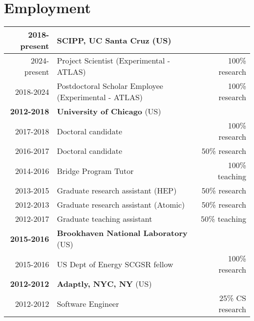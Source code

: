 \vspace{-2.0em}\section{Employment}\vspace{-1em}
\begin{table*}[h!]
	\footnotesize
	\begin{tabular}{r|lr}
		\centering
		\normalsize\textbf{2018-present} & \textbf{SCIPP, UC Santa Cruz} (US)                   &                  \\
		\hline
		2024-present                     & Project Scientist (Experimental - ATLAS)             & 100\% research   \\
		2018-2024                        & Postdoctoral Scholar Employee (Experimental - ATLAS) & 100\% research   \\
		\hline\hline
		\normalsize\textbf{2012-2018}    & \textbf{University of Chicago} (US)                  &                  \\
		\hline
		2017-2018                        & Doctoral candidate                                   & 100\% research   \\
		2016-2017                        & Doctoral candidate                                   & 50\% research    \\
		2014-2016                        & Bridge Program Tutor                                 & 100\% teaching   \\
		2013-2015                        & Graduate research assistant (HEP)                    & 50\% research    \\
		2012-2013                        & Graduate research assistant (Atomic)                 & 50\% research    \\
		2012-2017                        & Graduate teaching assistant                          & 50\% teaching    \\
		\hline\hline
		\normalsize\textbf{2015-2016}    & \textbf{Brookhaven National Laboratory} (US)         &                  \\
		\hline
		2015-2016                        & US Dept of Energy SCGSR fellow                       & 100\% research   \\
		\hline\hline
		\normalsize\textbf{2012-2012}    & \textbf{Adaptly, NYC, NY} (US)                                          \\
		\hline
		2012-2012                        & Software Engineer                                    & 25\% CS research \\

\end{tabular}
\end{table*}
